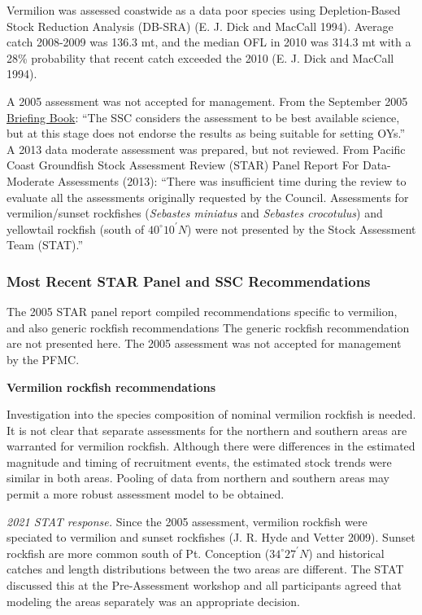\documentclass[
  english,
  a4paper,
]{article}
\begin{document}
Vermilion was assessed coastwide as a data poor species using
Depletion-Based Stock Reduction Analysis (DB-SRA) (E. J. Dick and MacCall 1994). Average catch
2008-2009 was 136.3 mt, and the median OFL in 2010 was 314.3 mt with a 28\%
probability that recent catch exceeded the 2010 (E. J. Dick and MacCall 1994).

A 2005 assessment was not accepted for management.
From the September 2005 \href{https://www.pcouncil.org/documents/2005/09/f-groundfish-management-september-2005.pdf/}{Briefing Book}:
``The SSC considers the assessment to be best available science, but at this stage does not
endorse the results as being suitable for setting OYs.'' A 2013 data moderate
assessment was prepared, but not reviewed. From Pacific Coast Groundfish Stock
Assessment Review (STAR) Panel Report For Data-Moderate Assessments (2013):
``There was insufficient time during the review to evaluate all the assessments
originally requested by the Council. Assessments for vermilion/sunset rockfishes
(\emph{Sebastes miniatus} and \emph{Sebastes crocotulus}) and yellowtail rockfish
(south of $40^\circ 10^\prime N$) were not presented by the Stock Assessment Team (STAT).''

\hypertarget{most-recent-star-panel-and-ssc-recommendations}{%
\subsubsection{Most Recent STAR Panel and SSC Recommendations}\label{most-recent-star-panel-and-ssc-recommendations}}

The 2005 STAR panel report compiled recommendations specific to vermilion, and also
generic rockfish recommendations The generic rockfish recommendation are not
presented here. The 2005 assessment was not accepted for management by the PFMC.

\textbf{Vermilion rockfish recommendations}

Investigation into the species composition of nominal vermilion rockfish is needed.
It is not clear that separate assessments for the northern and southern areas are warranted
for vermilion rockfish. Although there were differences in the estimated magnitude and
timing of recruitment events, the estimated stock trends were similar in both areas.
Pooling of data from northern and southern areas may permit a more robust assessment
model to be obtained.

\emph{2021 STAT response.} Since the 2005 assessment, vermilion rockfish were speciated
to vermilion and sunset rockfishes (J. R. Hyde and Vetter 2009). Sunset rockfish are more common south of
Pt. Conception ($34^\circ 27^\prime N$) and historical catches and length distributions between
the two areas are different. The STAT discussed this at the Pre-Assessment workshop
and all participants agreed that modeling the areas separately was an appropriate
decision.
\end{document}
